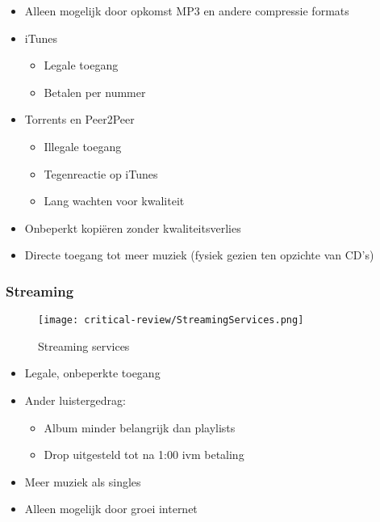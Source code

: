 
\begin{itemize}
    \item Alleen mogelijk door opkomst MP3 en andere compressie formats
    \item iTunes \begin{itemize}
        \item Legale toegang
        \item Betalen per nummer
    \end{itemize}
    \item Torrents en Peer2Peer \begin{itemize}
        \item Illegale toegang
        \item Tegenreactie op iTunes
        \item Lang wachten voor kwaliteit
    \end{itemize}
    \item Onbeperkt kopiëren zonder kwaliteitsverlies
    \item Directe toegang tot meer muziek (fysiek gezien ten opzichte van CD's)
\end{itemize}

\subsubsection*{Streaming}
\begin{wrapfigure}{r}{0.25\textwidth}
    \centering
    \texttt{[image: critical-review/StreamingServices.png]}
    \caption{Streaming services}
    \label{fig:critical-review:StreamingServices}
\end{wrapfigure}


\begin{itemize}
    \item Legale, onbeperkte toegang
    \item Ander luistergedrag: \begin{itemize}
        \item Album minder belangrijk dan playlists
        \item Drop uitgesteld tot na 1:00 ivm betaling
    \end{itemize}
    \item Meer muziek als singles
    \item Alleen mogelijk door groei internet
\end{itemize}

